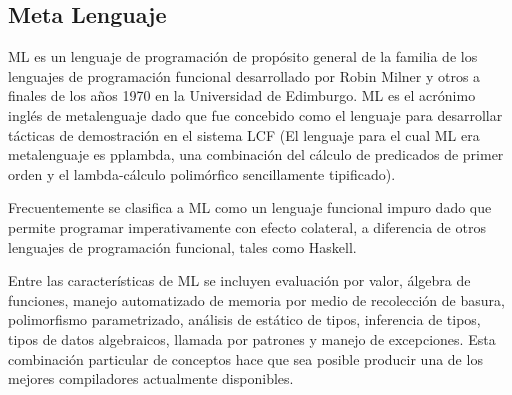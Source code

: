 \documentclass[twoside,twocolumn]{article}
\begin{document}
\subsection{Meta Lenguaje}

ML es un lenguaje de programación de propósito general de la familia de los lenguajes de programación funcional desarrollado por Robin Milner y otros a finales de los años 1970 en la Universidad de Edimburgo. ML es el acrónimo inglés de metalenguaje dado que fue concebido como el lenguaje para desarrollar tácticas de demostración en el sistema LCF (El lenguaje para el cual ML era metalenguaje es pplambda, una combinación del cálculo de predicados de primer orden y el lambda-cálculo polimórfico sencillamente tipificado).

Frecuentemente se clasifica a ML como un lenguaje funcional impuro dado que permite programar imperativamente con efecto colateral, a diferencia de otros lenguajes de programación funcional, tales como Haskell.

Entre las características de ML se incluyen evaluación por valor, álgebra de funciones, manejo automatizado de memoria por medio de recolección de basura, polimorfismo parametrizado, análisis de estático de tipos, inferencia de tipos, tipos de datos algebraicos, llamada por patrones y manejo de excepciones. Esta combinación particular de conceptos hace que sea posible producir una de los mejores compiladores actualmente disponibles.
\end{document}
